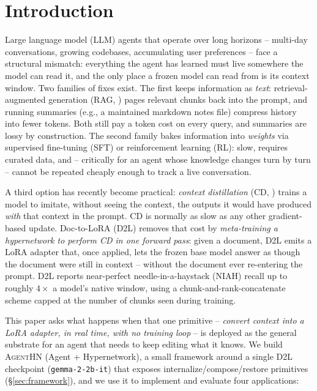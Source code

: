 \documentclass[11pt]{article}
\newcommand{\DTL}{D2L}
\newcommand{\agenthn}{\textsc{AgentHN}}
\newcommand{\mt}[1]{\texttt{\small #1}}
\begin{document}
\section{Introduction}

Large language model (LLM) agents that operate over long horizons -- multi-day conversations, growing codebases, accumulating user preferences -- face a structural mismatch: everything the agent has learned must live somewhere the model can read it, and the only place a frozen model can read from is its context window. Two families of fixes exist. The first keeps information as \emph{text}: retrieval-augmented generation (RAG, \citealp{lewis2020retrieval}) pages relevant chunks back into the prompt, and running summaries (e.g., a maintained markdown notes file) compress history into fewer tokens. Both still pay a token cost on every query, and summaries are lossy by construction. The second family bakes information into \emph{weights} via supervised fine-tuning (SFT) or reinforcement learning (RL): slow, requires curated data, and -- critically for an agent whose knowledge changes turn by turn -- cannot be repeated cheaply enough to track a live conversation.

A third option has recently become practical: \emph{context distillation} (CD, \citealp{snell2023learning,askell2021general}) trains a model to imitate, without seeing the context, the outputs it would have produced \emph{with} that context in the prompt. CD is normally as slow as any other gradient-based update. Doc-to-LoRA \citep{charakorn2026doctolora} (\DTL{}) removes that cost by \emph{meta-training a hypernetwork to perform CD in one forward pass}: given a document, \DTL{} emits a LoRA \citep{hu2022lora} adapter that, once applied, lets the frozen base model answer as though the document were still in context -- without the document ever re-entering the prompt. \DTL{} reports near-perfect needle-in-a-haystack (NIAH) recall up to roughly $4\times$ a model's native window, using a chunk-and-rank-concatenate scheme capped at the number of chunks seen during training.

This paper asks what happens when that one primitive -- \emph{convert context into a LoRA adapter, in real time, with no training loop} -- is deployed as the general substrate for an agent that needs to keep editing what it knows. We build \agenthn{} (Agent + Hypernetwork), a small framework around a single \DTL{} checkpoint (\mt{gemma-2-2b-it}) that exposes internalize/compose/restore primitives (\S\ref{sec:framework}), and we use it to implement and evaluate four applications:
\end{document}
